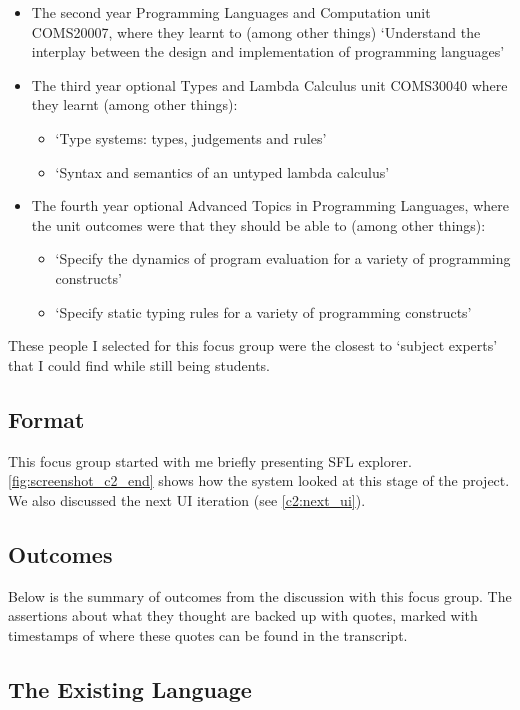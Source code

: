 \begin{itemize}
    \item The second year Programming Languages and Computation unit COMS20007, where they learnt to (among other things) `Understand the interplay between the design and implementation of programming languages' \cite{COMS20007_PLC}
    \item The third year optional Types and Lambda Calculus unit COMS30040 where they learnt (among other things): \cite{COMS30040_TLC} 
    \begin{itemize}
        \item `Type systems: types, judgements and rules'
        \item `Syntax and semantics of an untyped lambda calculus'
    \end{itemize}
    \item The fourth year optional Advanced Topics in Programming Languages, where the unit outcomes were that they should be able to (among other things): \cite{COMSM0067_ATPL}
    \begin{itemize}
        \item `Specify the dynamics of program evaluation for a variety of programming constructs'
        \item `Specify static typing rules for a variety of programming constructs'
    \end{itemize}
\end{itemize}

These people I selected for this focus group were the closest to `subject experts' that I could find while still being students. 

\subsection{Format}
This focus group started with me briefly presenting SFL explorer. \ref{fig:screenshot_c2_end} shows how the system looked at this stage of the project. We also discussed the next UI iteration (see \ref{c2:next_ui}). 

\subsection{Outcomes}
Below is the summary of outcomes from the discussion with this focus group. The assertions about what they thought are backed up with quotes, marked with timestamps of where these quotes can be found in the transcript. 

\subsection{The Existing Language}
